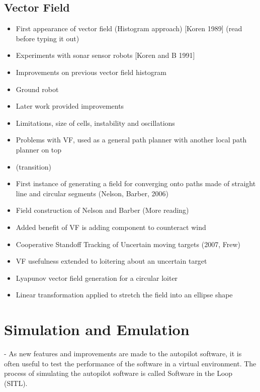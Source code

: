 \documentclass[numbered,pdftex]{ohio-etd}
\begin{document}
\subsection{Vector Field}
\begin{itemize}
	\item First appearance of vector field (Histogram approach) [Koren 1989] (read before typing it out)
	
	\item Experiments with sonar sensor robots [Koren and B 1991]
	
	\item \citep{borenstein_real-time_1990} Improvements on previous vector field histogram
	\item Ground robot
	\item Later work provided improvements
	\item Limitations, size of cells, instability and oscillations
	\item Problems with VF, used as a general path planner with another local path planner on top 
	\item (transition)
	
	
	\item First instance of generating a field for converging onto paths made of straight line and circular segments (Nelson, Barber, 2006)
	\item Field construction of Nelson and Barber (More reading)
	\item Added benefit of VF is adding component to counteract wind
	
	\item Cooperative Standoff Tracking of Uncertain moving targets (2007, Frew)
	\item VF usefulness extended to loitering about an uncertain target
	\item Lyapunov vector field generation for a circular loiter
	\item Linear transformation applied to stretch the field into an ellipse shape
\end{itemize}




\section{Simulation and Emulation}
- As new features and improvements are made to the autopilot software, it is often useful to test the performance of the software in a virtual environment. The process of simulating the autopilot software is called Software in the Loop (SITL).
\end{document}
